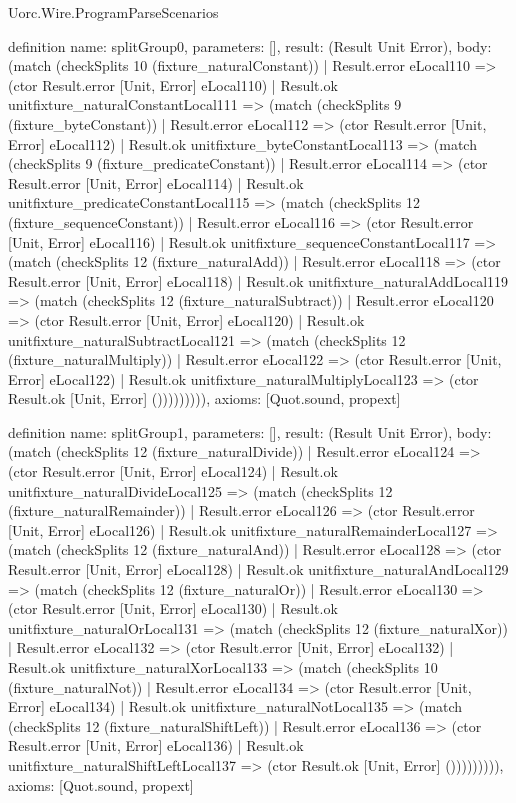 \begin{lexlean}{Uorc.Wire.ProgramParseScenarios}
\begin{semanticmodule}
definition{
  name: splitGroup0,
  parameters: [],
  result: (Result Unit Error),
  body: (match (checkSplits 10 (fixture_naturalConstant))
    | Result.error eLocal110 => (ctor Result.error [Unit, Error] eLocal110)
    | Result.ok unitfixture_naturalConstantLocal111 => (match (checkSplits 9 (fixture_byteConstant))
      | Result.error eLocal112 => (ctor Result.error [Unit, Error] eLocal112)
      | Result.ok unitfixture_byteConstantLocal113 => (match (checkSplits 9 (fixture_predicateConstant))
        | Result.error eLocal114 => (ctor Result.error [Unit, Error] eLocal114)
        | Result.ok unitfixture_predicateConstantLocal115 => (match (checkSplits 12 (fixture_sequenceConstant))
          | Result.error eLocal116 => (ctor Result.error [Unit, Error] eLocal116)
          | Result.ok unitfixture_sequenceConstantLocal117 => (match (checkSplits 12 (fixture_naturalAdd))
            | Result.error eLocal118 => (ctor Result.error [Unit, Error] eLocal118)
            | Result.ok unitfixture_naturalAddLocal119 => (match (checkSplits 12 (fixture_naturalSubtract))
              | Result.error eLocal120 => (ctor Result.error [Unit, Error] eLocal120)
              | Result.ok unitfixture_naturalSubtractLocal121 => (match (checkSplits 12 (fixture_naturalMultiply))
                | Result.error eLocal122 => (ctor Result.error [Unit, Error] eLocal122)
                | Result.ok unitfixture_naturalMultiplyLocal123 => (ctor Result.ok [Unit, Error] ())))))))),
  axioms: [Quot.sound, propext]
}

definition{
  name: splitGroup1,
  parameters: [],
  result: (Result Unit Error),
  body: (match (checkSplits 12 (fixture_naturalDivide))
    | Result.error eLocal124 => (ctor Result.error [Unit, Error] eLocal124)
    | Result.ok unitfixture_naturalDivideLocal125 => (match (checkSplits 12 (fixture_naturalRemainder))
      | Result.error eLocal126 => (ctor Result.error [Unit, Error] eLocal126)
      | Result.ok unitfixture_naturalRemainderLocal127 => (match (checkSplits 12 (fixture_naturalAnd))
        | Result.error eLocal128 => (ctor Result.error [Unit, Error] eLocal128)
        | Result.ok unitfixture_naturalAndLocal129 => (match (checkSplits 12 (fixture_naturalOr))
          | Result.error eLocal130 => (ctor Result.error [Unit, Error] eLocal130)
          | Result.ok unitfixture_naturalOrLocal131 => (match (checkSplits 12 (fixture_naturalXor))
            | Result.error eLocal132 => (ctor Result.error [Unit, Error] eLocal132)
            | Result.ok unitfixture_naturalXorLocal133 => (match (checkSplits 10 (fixture_naturalNot))
              | Result.error eLocal134 => (ctor Result.error [Unit, Error] eLocal134)
              | Result.ok unitfixture_naturalNotLocal135 => (match (checkSplits 12 (fixture_naturalShiftLeft))
                | Result.error eLocal136 => (ctor Result.error [Unit, Error] eLocal136)
                | Result.ok unitfixture_naturalShiftLeftLocal137 => (ctor Result.ok [Unit, Error] ())))))))),
  axioms: [Quot.sound, propext]
}


\end{semanticmodule}
\end{lexlean}
